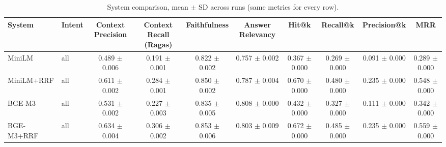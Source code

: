 \begin{table}[t]
\centering
\caption{System comparison, mean $\pm$ SD across runs (same metrics for every row).}
\label{tab:systems-overall}
\begin{tabular}{llcccccccc}
\toprule
System & Intent & Context Precision & Context Recall (Ragas) & Faithfulness & Answer Relevancy & Hit@k & Recall@k & Precision@k & MRR \\
\midrule
MiniLM & all & 0.489 $\pm$ 0.006 & 0.191 $\pm$ 0.001 & 0.822 $\pm$ 0.002 & 0.757 $\pm$ 0.002 & 0.367 $\pm$ 0.000 & 0.269 $\pm$ 0.000 & 0.091 $\pm$ 0.000 & 0.289 $\pm$ 0.000 \\
MiniLM+RRF & all & 0.611 $\pm$ 0.002 & 0.284 $\pm$ 0.001 & 0.850 $\pm$ 0.002 & 0.787 $\pm$ 0.004 & 0.670 $\pm$ 0.000 & 0.480 $\pm$ 0.000 & 0.235 $\pm$ 0.000 & 0.548 $\pm$ 0.000 \\
BGE-M3 & all & 0.531 $\pm$ 0.002 & 0.227 $\pm$ 0.003 & 0.835 $\pm$ 0.005 & 0.808 $\pm$ 0.000 & 0.432 $\pm$ 0.000 & 0.327 $\pm$ 0.000 & 0.111 $\pm$ 0.000 & 0.342 $\pm$ 0.000 \\
BGE-M3+RRF & all & 0.634 $\pm$ 0.004 & 0.306 $\pm$ 0.002 & 0.853 $\pm$ 0.006 & 0.803 $\pm$ 0.009 & 0.672 $\pm$ 0.000 & 0.485 $\pm$ 0.000 & 0.235 $\pm$ 0.000 & 0.559 $\pm$ 0.000 \\
\bottomrule
\end{tabular}
\end{table}